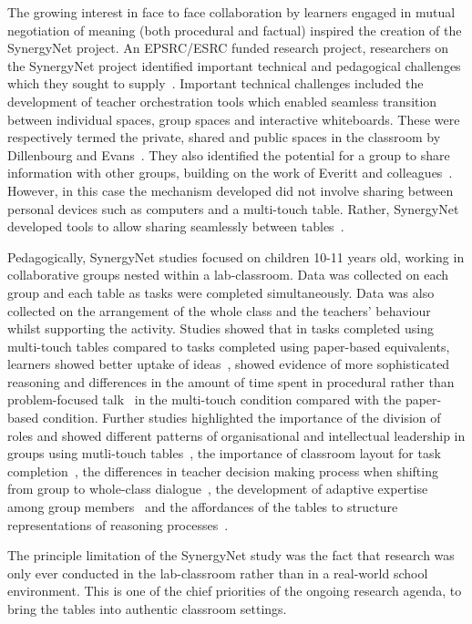 \documentclass[a4paper,11pt]{article}
\begin{document}
The growing interest in face to face collaboration by learners engaged in mutual negotiation of meaning (both procedural and factual) inspired the creation of the SynergyNet project.
An EPSRC/ESRC funded research project, researchers on the SynergyNet project identified important technical and pedagogical challenges which they sought to supply~\cite{higgins-et-al:2012}.
Important technical challenges included the development of teacher orchestration tools which enabled seamless transition between individual spaces, group spaces and interactive whiteboards.
These were respectively termed the private, shared and public spaces in the classroom by Dillenbourg and Evans~\cite{dillenbourg:2011}.
They also identified the potential for a group to share information with other groups, building on the work of Everitt and colleagues~\cite{everitt:2006}.
However, in this case the mechanism developed did not involve sharing between personal devices such as computers and a multi-touch table.
Rather, SynergyNet developed tools to allow sharing seamlessly between tables~\cite{hatch:2011b}.

Pedagogically, SynergyNet studies focused on children 10-11 years old, working in collaborative groups nested within a lab-classroom.
Data was collected on each group and each table as tasks were completed simultaneously.
Data was also collected on the arrangement of the whole class and the teachers’ behaviour whilst supporting the activity.
Studies showed that in tasks completed using multi-touch tables compared to tasks completed using paper-based equivalents, learners showed better uptake of ideas~\cite{mercier:2015}, showed evidence of more sophisticated reasoning  and differences in the amount of time spent in procedural rather than problem-focused talk~\cite{higgins-et-al:2012} in the multi-touch condition compared with the paper-based condition.
Further studies highlighted the importance of the division of roles and showed different patterns of organisational and intellectual leadership in groups using mutli-touch tables~\cite{mercier2014d}, the importance of classroom layout for task completion~\cite{mercier:2014c}, the differences in teacher decision making process when shifting from group to whole-class dialogue~\cite{Joyce-Gibbons:2016}, the development of adaptive expertise among group members~\cite{mercier:2013} and the affordances of the tables to structure representations of reasoning processes~\cite{mercier:2014b}.

The principle limitation of the SynergyNet study was the fact that research was only ever conducted in the lab-classroom rather than in a real-world school environment.
This is one of the chief priorities of the ongoing research agenda, to bring the tables into authentic classroom settings.
\end{document}
